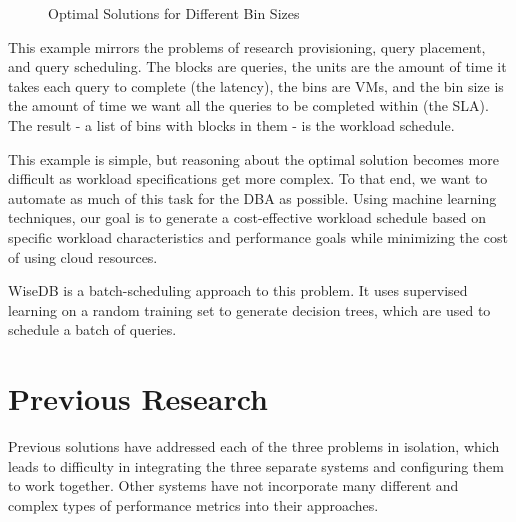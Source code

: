 \documentclass{brandiss}
\numberwithin{section}{chapter}
\numberwithin{figure}{chapter}
\theoremstyle{definition}
\theoremstyle{plain}
\theoremstyle{remark}
\begin{document}
\begin{figure}[!tbp]
  \centering
  \hfill
  \caption{Optimal Solutions for Different Bin Sizes}
\end{figure}

This example mirrors the problems of research provisioning, query placement, and query scheduling. The blocks are queries, the units are the amount of time it takes each query to complete (the latency), the bins are VMs, and the bin size is the amount of time we want all the queries to be completed within (the SLA). The result - a list of bins with blocks in them - is the workload schedule.

This example is simple, but reasoning about the optimal solution becomes more difficult as workload specifications get more complex. To that end, we want to automate as much of this task for the DBA as possible. Using machine learning techniques, our goal is to generate a cost-effective workload schedule based on specific workload characteristics and performance goals while minimizing the cost of using cloud resources. 

WiseDB is a batch-scheduling approach to this problem. It uses supervised learning on a random training set to generate decision trees, which are used to schedule a batch of queries.


\section{Previous Research}

Previous solutions have addressed each of the three problems in isolation, which leads to difficulty in integrating the three separate systems and configuring them to work together. Other systems have not incorporate many different and complex types of performance metrics into their approaches. 
\end{document}

